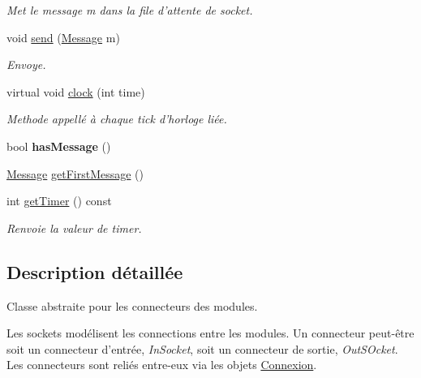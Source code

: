 \begin{DoxyCompactItemize}
\begin{DoxyCompactList}\small\item\em Met le message m dans la file d'attente de socket. \end{DoxyCompactList}\item 
\hypertarget{classSocket_af7fb88a308724635a3ca3ed040b87b1a}{void \hyperlink{classSocket_af7fb88a308724635a3ca3ed040b87b1a}{send} (\hyperlink{classMessage}{Message} m)}\label{classSocket_af7fb88a308724635a3ca3ed040b87b1a}

\begin{DoxyCompactList}\small\item\em Envoye. \end{DoxyCompactList}\item 
\hypertarget{classSocket_a6bd5bddfabd838a3388b445c21d3c41e}{virtual void \hyperlink{classSocket_a6bd5bddfabd838a3388b445c21d3c41e}{clock} (int time)}\label{classSocket_a6bd5bddfabd838a3388b445c21d3c41e}

\begin{DoxyCompactList}\small\item\em Methode appellé à chaque tick d'horloge liée. \end{DoxyCompactList}\item 
\hypertarget{classSocket_afe7c9b2ef7fb3653b14f5f462293549a}{bool {\bfseries has\-Message} ()}\label{classSocket_afe7c9b2ef7fb3653b14f5f462293549a}

\item 
\hyperlink{classMessage}{Message} \hyperlink{classSocket_a11216b0cc55de06256500e7b67faa24d}{get\-First\-Message} ()
\item 
\hypertarget{classSocket_aa890633022a29b56ed3844684d32e0fc}{int \hyperlink{classSocket_aa890633022a29b56ed3844684d32e0fc}{get\-Timer} () const }\label{classSocket_aa890633022a29b56ed3844684d32e0fc}

\begin{DoxyCompactList}\small\item\em Renvoie la valeur de timer. \end{DoxyCompactList}\end{DoxyCompactItemize}


\subsection{Description détaillée}
Classe abstraite pour les connecteurs des modules. 

Les sockets modélisent les connections entre les modules. Un connecteur peut-\/être soit un connecteur d'entrée, {\itshape In\-Socket}, soit un connecteur de sortie, {\itshape Out\-S\-Ocket}. Les connecteurs sont reliés entre-\/eux via les objets \hyperlink{classConnexion}{Connexion}. 

